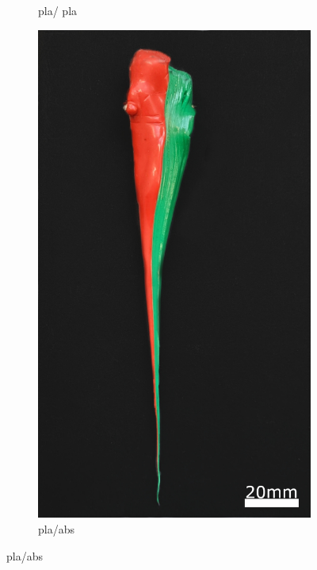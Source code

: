 \begin{figure}[!h]
\begin{subfigure}[]{.29\textwidth}
         \caption{\acs{pla}/ \acs{pla}} 
         \label{fig:probe2}
     \end{subfigure}
     \hspace{5mm}
     \begin{subfigure}[]{.29\textwidth}
         \includegraphics[width=\textwidth]{Abbildungen/Versuche/probe2_w.jpg}
         \caption{\acs{pla}/\acs{abs}}
         \label{fig:probe3}
     \end{subfigure}
     \hspace{5mm}

\end{figure}
